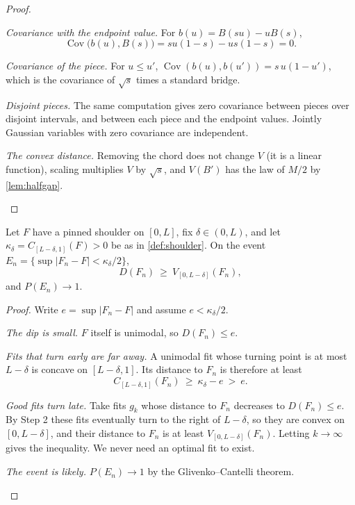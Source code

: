 \begin{proof}
\begin{steps}
\item \emph{Covariance with the endpoint value.} For $b(u)=B(su)-uB(s)$,
\[
\operatorname{Cov}\bigl(b(u),B(s)\bigr)=su(1-s)-us(1-s)=0 .
\]
\item \emph{Covariance of the piece.} For $u\le u'$, $\operatorname{Cov}(b(u),b(u'))=s\,u(1-u')$, which is the covariance of $\sqrt s$ times a standard bridge.
\item \emph{Disjoint pieces.} The same computation gives zero covariance between pieces over disjoint intervals, and between each piece and the endpoint values. Jointly Gaussian variables with zero covariance are independent.
\item \emph{The convex distance.} Removing the chord does not change $V$ (it is a linear function), scaling multiplies $V$ by $\sqrt s$, and $V(B')$ has the law of $M/2$ by \cref{lem:halfgap}.\qedhere
\end{steps}
\end{proof}

\begin{lemma}[localisation]\label{lem:local}
Let $F$ have a pinned shoulder on $[0,L]$, fix $\delta\in(0,L)$, and let $\kappa_\delta=C_{[L-\delta,1]}(F)>0$ be as in \cref{def:shoulder}. On the event $E_n=\{\sup|F_n-F|<\kappa_\delta/2\}$,
\[
D(F_n)\ \ge\ V_{[0,L-\delta]}(F_n),
\]
and $P(E_n)\to1$.
\end{lemma}


\begin{proof}
Write $e=\sup|F_n-F|$ and assume $e<\kappa_\delta/2$.
\begin{steps}
\item \emph{The dip is small.} $F$ itself is unimodal, so $D(F_n)\le e$.
\item \emph{Fits that turn early are far away.} A unimodal fit whose turning point is at most $L-\delta$ is concave on $[L-\delta,1]$. Its distance to $F_n$ is therefore at least
\[
C_{[L-\delta,1]}(F_n)\ \ge\ \kappa_\delta-e\ >\ e .
\]
\item \emph{Good fits turn late.} Take fits $g_k$ whose distance to $F_n$ decreases to $D(F_n)\le e$. By Step 2 these fits eventually turn to the right of $L-\delta$, so they are convex on $[0,L-\delta]$, and their distance to $F_n$ is at least $V_{[0,L-\delta]}(F_n)$. Letting $k\to\infty$ gives the inequality. We never need an optimal fit to exist.
\item \emph{The event is likely.} $P(E_n)\to1$ by the Glivenko--Cantelli theorem.\qedhere
\end{steps}
\end{proof}

